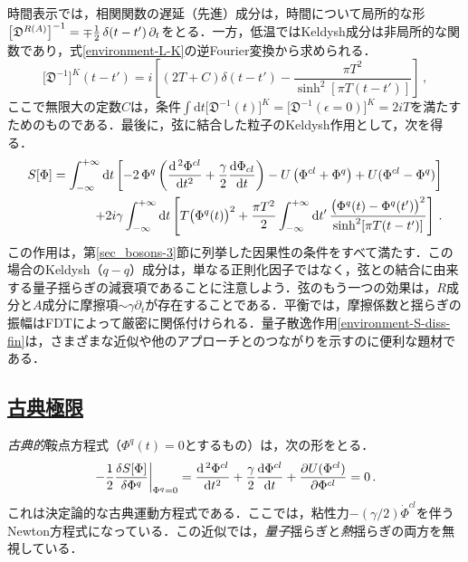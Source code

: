 \documentclass[a4paper,11pt]{ltjsarticle}
\newcommand{\subsectionlink}[1]{\subsection[#1]{\hyperlink{toc}{#1}}}
\def\d{\mathrm{d}}
\begin{document}
時間表示では，相関関数の遅延（先進）成分は，時間について局所的な形$\big[\mathfrak{D}^{R(A)}\big]^{-1}= \mp {1\over
2}\,\delta(t-t')\,\partial_{t}$をとる．一方，低温ではKeldysh成分は非局所的な関数であり，式\eqref{environment-L-K}の逆Fourier変換から求められる．
\begin{equation}\label{eqenvironment-L-K-time}
\big[\mathfrak{D}^{-1}\big]^{K}(t-t') =i\left[(2T+C)\delta(t-t')-
\frac{\pi T^2}{\sinh^2[\pi T(t-t')]}\right]\,,
\end{equation}ここで無限大の定数$C$は，条件$\int\d t\big[\mathfrak{D}^{-1}(t)\big]^{K}=
\big[\mathfrak{D}^{-1}(\epsilon=0)\big]^{K}=2iT$を満たすためのものである．最後に，弦に結合した粒子のKeldysh作用として，次を得る．
\begin{eqnarray}\label{environment-S-diss-fin}
S[\Phi]=\int_{-\infty}^{+\infty}\d t\left[-2\,\Phi^q\left({\d^{\,2}
\Phi^{cl}\over \d t^2} +{\gamma\over 2}{\d \Phi_{cl}\over \d
t}\right)- U\left(\Phi^{cl}+\Phi^{q}\right)+ U(\Phi^{cl}-\Phi^{q})
\right]\nonumber
\\
 +2i\gamma\int^{+\infty}_{-\infty}\d t\left[T\big(\Phi^{q}(t)\big)^2+
  \frac{\pi T^2}{2} \int_{-\infty}^{+\infty}\d t'\,
\frac{\big(\Phi^q(t)-\Phi^q(t')\big)^2}{\sinh^2[\pi
T(t-t')]}\right]\,.
\end{eqnarray}この作用は，第\ref{sec_bosons-3}節に列挙した因果性の条件をすべて満たす．この場合のKeldysh（$q-q$）成分は，単なる正則化因子ではなく，弦との結合に由来する量子揺らぎの減衰項であることに注意しよう．弦のもう一つの効果は，$R$成分と$A$成分に摩擦項$\sim \gamma\partial_t$が存在することである．平衡では，摩擦係数と揺らぎの振幅はFDTによって厳密に関係付けられる．量子散逸作用\eqref{environment-S-diss-fin}は，さまざまな近似や他のアプローチとのつながりを示すのに便利な題材である．


\subsectionlink{古典極限}\label{sec_environment-2}


\emph{古典的}鞍点方程式（$\Phi^{q}(t)=0$とするもの）は，次の形をとる．
\begin{equation}\label{environment-Newton-eq}
\left. -{1\over 2}\frac{\delta S[\Phi]}{\delta
\Phi^{q}}\right|_{\Phi^{q}=0} = {\d^{\,2} \Phi^{cl}\over \d t^2}
+{\gamma\over 2}{\d \Phi^{cl}\over \d t} + {\partial
U(\Phi^{cl})\over
\partial \Phi^{cl} } =0 \, .
\end{equation}これは決定論的な古典運動方程式である．ここでは，粘性力$-(\gamma/2) \dot \Phi^{cl}$を伴うNewton方程式になっている．この近似では，\emph{量子}揺らぎと\emph{熱}揺らぎの両方を無視している．
\end{document}
